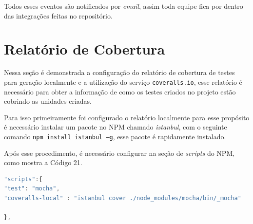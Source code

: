\par Todos esses eventos são notificados por \textit{email}, assim toda equipe fica por dentro das integrações feitas no repositório.

\newpage
\section{Relatório de Cobertura}


\par Nessa seção é demonstrada a configuração do relatório de cobertura de testes para geração localmente e a utilização do serviço \texttt{coveralls.io}, esse relatório é necessário para obter a informação de como os testes criados no projeto estão cobrindo as unidades criadas.

\par Para isso primeiramente foi configurado o relatório localmente para esse propósito  é necessário instalar um pacote no NPM chamado \textit{istanbul}, com o seguinte comando \texttt{npm install istanbul –g}, esse pacote é rapidamente instalado.

\par Após esse procedimento, é necessário configurar na seção de \textit{scripts} do NPM, como mostra a Código 21.



\begin{lstlisting}[language=JavaScript, caption={[Configurar o relatório de cobertura com o NPM.]{Configurar o relatório de cobertura com o NPM.  \textbf{Fonte:} Elaborado pelos autores.}}]
"scripts":{
"test": "mocha",
"coveralls-local" : "istanbul cover ./node_modules/mocha/bin/_mocha"

},
\end{lstlisting}

